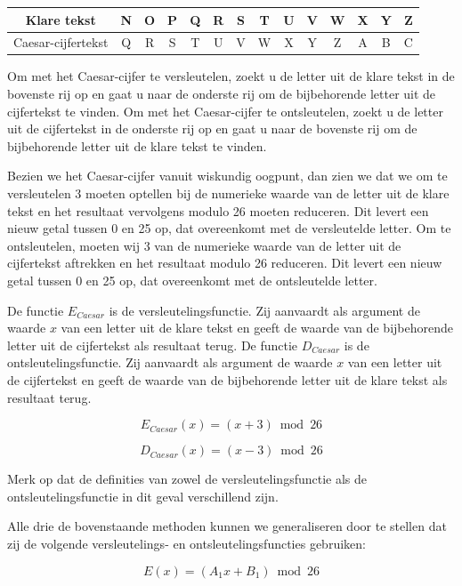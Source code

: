 \begin{center}
  \begin{tabular}{|c|c|c|c|c|c|c|c|c|c|c|c|c|c|}
  \hline
    Klare tekst & N & O & P & Q & R & S & T & U & V & W & X & Y & Z \\ \hline    Caesar-cijfertekst & Q & R & S & T & U & V & W & X & Y & Z & A & B & C \\ \hline
  \end{tabular}
\end{center}

\normalsize

Om met het Caesar-cijfer te versleutelen, zoekt u de letter uit de klare tekst in de bovenste rij op en gaat u naar de onderste rij om de bijbehorende letter uit de cijfertekst te vinden. Om met het Caesar-cijfer te ontsleutelen, zoekt u de letter uit de cijfertekst in de onderste rij op en gaat u naar de bovenste rij om de bijbehorende letter uit de klare tekst te vinden.

Bezien we het Caesar-cijfer vanuit wiskundig oogpunt, dan zien we dat we om te versleutelen 3 moeten optellen bij de numerieke waarde van de letter uit de klare tekst en het resultaat vervolgens modulo 26 moeten reduceren. Dit levert een nieuw getal tussen 0 en 25 op, dat overeenkomt met de versleutelde letter. Om te ontsleutelen, moeten wij 3 van de numerieke waarde van de letter uit de cijfertekst aftrekken en het resultaat modulo 26 reduceren. Dit levert een nieuw getal tussen 0 en 25 op, dat overeenkomt met de ontsleutelde letter.

De functie $E_{Caesar}$ is de versleutelingsfunctie. Zij aanvaardt als argument de waarde $x$ van een letter uit de klare tekst en geeft de waarde van de bijbehorende letter uit de cijfertekst als resultaat terug. De functie $D_{Caesar}$ is de ontsleutelingsfunctie. Zij aanvaardt als argument de waarde $x$ van een letter uit de cijfertekst en geeft de waarde van de bijbehorende letter uit de klare tekst als resultaat terug.

\[
  E_{Caesar}(x) = (x + 3) \bmod 26
\]

\[
  D_{Caesar}(x) = (x - 3) \bmod 26
\]

Merk op dat de definities van zowel de versleutelingsfunctie als de ontsleutelingsfunctie in dit geval verschillend zijn.

Alle drie de bovenstaande methoden kunnen we generaliseren door te stellen dat zij de volgende versleutelings- en ontsleutelingsfuncties gebruiken:

\[
 E(x) = (A_{1}x + B_{1}) \bmod 26
\]

